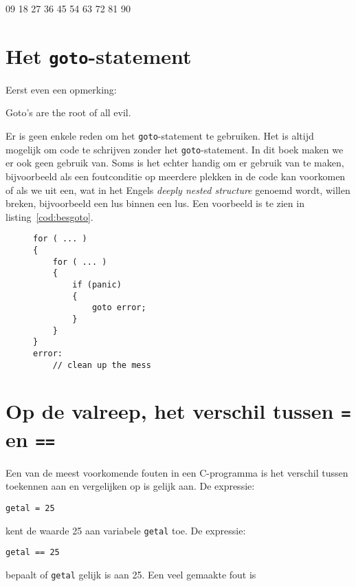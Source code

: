 \begin{dosbox}[title=Uitvoer van de tafel van 9.,label=fig:besuitvoer9]
09
18
27
36
45
54
63
72
81
90
\end{dosbox}

\section{Het \texttt{goto}-statement}
Eerst even een opmerking:

\begin{displayquote}
Goto's are the root of all evil.
\end{displayquote}

Er is geen enkele reden om het \texttt{goto}-statement te gebruiken. Het is altijd mogelijk om code te schrijven zonder het \texttt{goto}-statement. In dit boek maken we er ook geen gebruik van. Soms is het echter handig om er gebruik van te maken, bijvoorbeeld als een foutconditie op meerdere plekken in de code kan voorkomen of als we uit een, wat in het Engels \textsl{deeply nested structure} genoemd wordt, willen breken, bijvoorbeeld een lus binnen een lus. Een voorbeeld is te zien in listing~\ref{cod:besgoto}.


\begin{figure}[!ht]
\begin{lstlisting}[caption=Gebruik van het \texttt{goto}-statement.,label=cod:besgoto]
for ( ... )
{
    for ( ... )
    {
        if (panic)
        {
            goto error;
        }
    }   
}
error:
    // clean up the mess
\end{lstlisting}
\end{figure}


\section{Op de valreep, het verschil tussen \texttt{=} en \texttt{==}}
\label{sec:valreep}
Een van de meest voorkomende fouten in een C-programma is het verschil tussen toekennen aan en vergelijken op is gelijk aan. De expressie:

\hspace*{1em}\texttt{getal = 25}

kent de waarde 25 aan variabele \texttt{getal} toe. De expressie:

\hspace*{1em}\texttt{getal == 25}

bepaalt of \texttt{getal} gelijk is aan 25. Een veel gemaakte fout is

